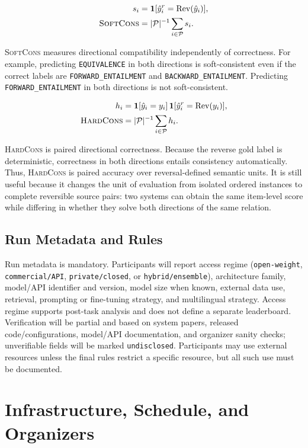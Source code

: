\documentclass[11pt]{article}
\newcommand{\SoftCons}{\textsc{SoftCons}}
\newcommand{\HardCons}{\textsc{HardCons}}
\newcommand{\Rev}{\mathrm{Rev}}
\begin{document}
\begin{align*}
s_i &= \mathbf{1}[\hat{y}_i^r=\Rev(\hat{y}_i)],\\
\SoftCons{} &= |\mathcal{P}|^{-1}\sum_{i\in\mathcal{P}} s_i .
\end{align*}

\SoftCons{} measures directional compatibility independently of correctness.
For example, predicting \texttt{EQUIVALENCE} in both directions is soft-consistent even if the correct labels are \texttt{FORWARD\_ENTAILMENT} and \texttt{BACKWARD\_ENTAILMENT}.
Predicting \texttt{FORWARD\_ENTAILMENT} in both directions is not soft-consistent.

\begin{align*}
h_i &= \mathbf{1}[\hat{y}_i=y_i]\,
      \mathbf{1}[\hat{y}_i^r=\Rev(y_i)],\\
\HardCons{} &= |\mathcal{P}|^{-1}\sum_{i\in\mathcal{P}} h_i .
\end{align*}

\HardCons{} is paired directional correctness.
Because the reverse gold label is deterministic, correctness in both directions entails consistency automatically.
Thus, \HardCons{} is paired accuracy over reversal-defined semantic units.
It is still useful because it changes the unit of evaluation from isolated ordered instances to complete reversible source pairs: two systems can obtain the same item-level score while differing in whether they solve both directions of the same relation.

\subsection{Run Metadata and Rules}

Run metadata is mandatory.
Participants will report access regime (\texttt{open-weight}, \texttt{commercial/API}, \texttt{private/closed}, or \texttt{hybrid/ensemble}), architecture family, model/API identifier and version, model size when known, external data use, retrieval, prompting or fine-tuning strategy, and multilingual strategy.
Access regime supports post-task analysis and does not define a separate leaderboard.
Verification will be partial and based on system papers, released code/configurations, model/API documentation, and organizer sanity checks; unverifiable fields will be marked \texttt{undisclosed}.
Participants may use external resources unless the final rules restrict a specific resource, but all such use must be documented.

\section{Infrastructure, Schedule, and Organizers}
\end{document}
